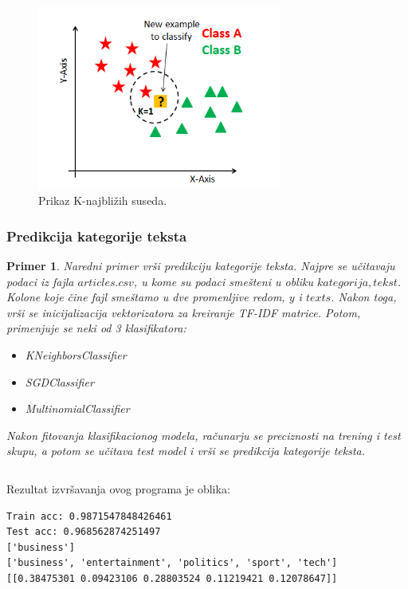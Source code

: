 \documentclass[a4paper]{article}
\newtheorem{primer}{Primer}[section]
\begin{document}
\begin{figure}[t]
\includegraphics[width=8cm]{Pictures/slika2.png}
\centering
\caption{Prikaz K-najbližih suseda.}
\end{figure}
\newpage
\subsubsection{Predikcija kategorije teksta}
\begin{primer}
Naredni primer vrši predikciju kategorije teksta. Najpre se učitavaju podaci iz fajla $articles.csv$, u kome su podaci smešteni u obliku $kategorija, tekst$. Kolone koje čine fajl smeštamo u dve promenljive redom, $y$ i $texts$. Nakon toga, vrši se inicijalizacija vektorizatora za kreiranje TF-IDF matrice. Potom, primenjuje se neki od 3 klasifikatora:
\begin{itemize}
\item KNeighborsClassifier
\item SGDClassifier
\item MultinomialClassifier
\end{itemize}
Nakon fitovanja klasifikacionog modela, računarju se preciznosti na trening i test skupu, a potom se učitava test model i vrši se predikcija kategorije teksta. 
\end{primer}
\inputminted{python}{Codes/1/classifier.py}
Rezultat izvršavanja ovog programa je oblika:
\begin{lstlisting}
Train acc: 0.9871547848426461
Test acc: 0.968562874251497
['business']
['business', 'entertainment', 'politics', 'sport', 'tech']
[[0.38475301 0.09423106 0.28803524 0.11219421 0.12078647]]
\end{lstlisting}
\end{document}
